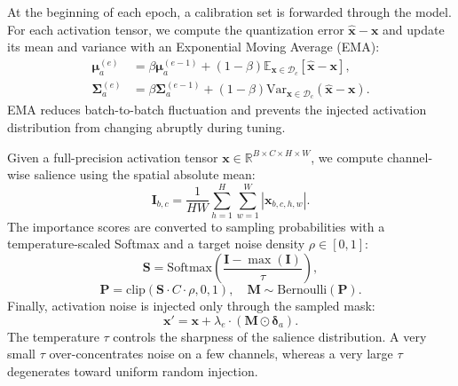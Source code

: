 \documentclass{article}
\begin{document}
At the beginning of each epoch, a calibration set is forwarded through the model. For each activation tensor, we compute the quantization error $\hat{\boldsymbol{x}}-\boldsymbol{x}$ and update its mean and variance with an Exponential Moving Average (EMA):
\begin{align}
    \boldsymbol{\mu}_{a}^{(e)} &= \beta \boldsymbol{\mu}_{a}^{(e-1)} + (1-\beta) \mathbb{E}_{\boldsymbol{x} \in \mathscr{D}_c}[\hat{\boldsymbol{x}} - \boldsymbol{x}], \label{eqt:aqe_mean_ema} \\
    \boldsymbol{\Sigma}_{a}^{(e)} &= \beta \boldsymbol{\Sigma}_{a}^{(e-1)} + (1-\beta) \mathrm{Var}_{\boldsymbol{x} \in \mathscr{D}_c}(\hat{\boldsymbol{x}} - \boldsymbol{x}). \label{eqt:aqe_var_ema}
\end{align}
EMA reduces batch-to-batch fluctuation and prevents the injected activation distribution from changing abruptly during tuning.

Given a full-precision activation tensor $\boldsymbol{x} \in \mathbb{R}^{B \times C \times H \times W}$, we compute channel-wise salience using the spatial absolute mean:
\begin{equation}
\label{eqt:channel_importance}
\boldsymbol{I}_{b,c} = \frac{1}{HW} \sum_{h=1}^H \sum_{w=1}^W |\boldsymbol{x}_{b,c,h,w}|.
\end{equation}
The importance scores are converted to sampling probabilities with a temperature-scaled Softmax and a target noise density $\rho \in [0, 1]$:
\begin{equation}
\label{eqt:salience_score}
\boldsymbol{S} = \mathrm{Softmax}\left( \frac{\boldsymbol{I} - \max(\boldsymbol{I})}{\tau} \right),
\end{equation}
\begin{equation}
\label{eqt:bernoulli_mask}
\boldsymbol{P} = \mathrm{clip}\left( \boldsymbol{S} \cdot C \cdot \rho, 0, 1 \right), \quad \boldsymbol{M} \sim \mathrm{Bernoulli}(\boldsymbol{P}).
\end{equation}
Finally, activation noise is injected only through the sampled mask:
\begin{equation}
\label{eqt:aqn_stoch_injection}
    \boldsymbol{x}' = \boldsymbol{x} + \lambda_e \cdot (\boldsymbol{M} \odot \boldsymbol{\delta}_{a}).
\end{equation}
The temperature $\tau$ controls the sharpness of the salience distribution. A very small $\tau$ over-concentrates noise on a few channels, whereas a very large $\tau$ degenerates toward uniform random injection.
\end{document}
